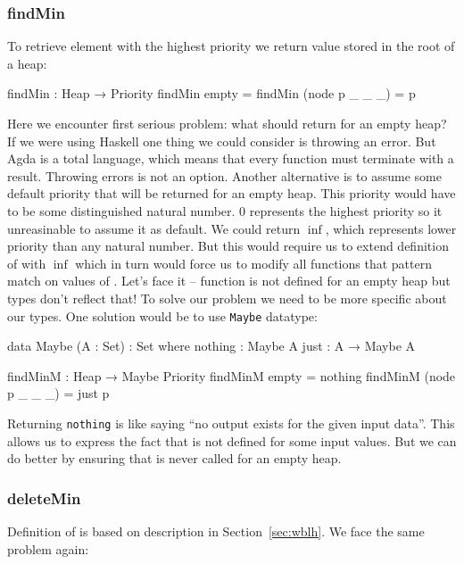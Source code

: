 \subsubsection{findMin}

To retrieve element with the highest priority we return value stored in the root of a heap:

\begin{code}
findMin : Heap → Priority
findMin empty          = 
findMin (node p _ _ _) = p
\end{code}

Here we encounter first serious problem: what should \findMin return for an empty heap? If we were using Haskell one thing we could consider is throwing an error. But Agda is a total language, which means that every function must terminate with a result. Throwing errors is not an option. Another alternative is to assume some default priority that will be returned for an empty heap. This priority would have to be some distinguished natural number. $0$ represents the highest priority so it unreasinable to assume it as default. We could return $\inf$, which represents lower priority than any natural number. But this would require us to extend definition of \Nat with $\inf$ which in turn would force us to modify all functions that pattern match on values of \Nat. Let's face it -- \findMin function is not defined for an empty heap but types don't reflect that! To solve our problem we need to be more specific about our types. One solution would be to use \texttt{Maybe} datatype:

\begin{code}
data Maybe (A : Set) : Set where
  nothing : Maybe A
  just    : A → Maybe A

findMinM : Heap → Maybe Priority
findMinM empty          = nothing
findMinM (node p _ _ _) = just p
\end{code}

Returning \texttt{nothing} is like saying ``no output exists for the given input data''. This allows us to express the fact that \findMin is not defined for some input values. But we can do better by ensuring that \findMin is never called for an empty heap.

\subsubsection{deleteMin}

Definition of \deleteMin is based on description in Section~\ref{sec:wblh}. We face the same problem again:


